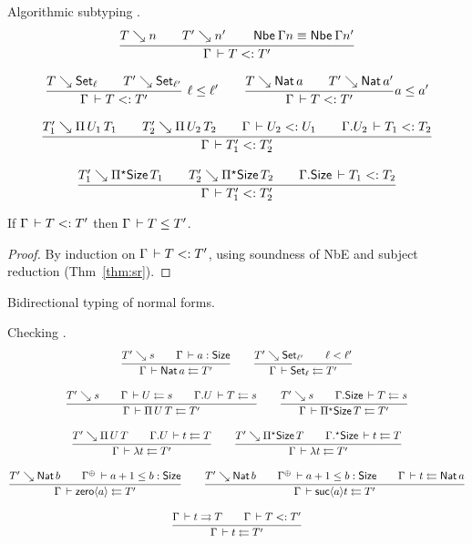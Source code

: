 \documentclass[acmlarge,review,anonymous]{acmart}\settopmatter{printfolios=true}
\begin{document}
Algorithmic subtyping .
\begin{gather*}
  \ru{T \evalsto n \qquad
      T' \evalsto n' \qquad
      \Nbe \Gamma n \equiv \Nbe \Gamma n'
    }{\Gamma \der T \asub T'}
\\[2ex]
  \rux{T \evalsto \Set[\ell] \qquad
      T' \evalsto \Set[\ell']
    }{\Gamma \der T \asub T'
    }{\ell \leq \ell'}
\qquad
  \ru{T \evalsto \Nat a \qquad
      T' \evalsto \Nat a'
    }{\Gamma \der T \asub T'
    }{a \leq a'}
\\[2ex]
  \ru{T_1' \evalsto \piT{U_1}{T_1} \qquad
      T_2' \evalsto \piT{U_2}{T_2} \qquad
      \Gamma \der U_2 \asub U_1 \qquad
      \cext \Gamma {U_2} \der T_1 \asub T_2
    }{\Gamma \der T_1' \asub T_2'}
\\[2ex]
  \ru{T_1' \evalsto \epiT\Size{T_1} \qquad
      T_2' \evalsto \epiT\Size{T_2} \qquad
      \cext \Gamma {\Size} \der T_1 \asub T_2
    }{\Gamma \der T_1' \asub T_2'}
\end{gather*}

\begin{lemma}
  \label{lem:asubsound}
  If $\Gamma \,\vdash T \mathrel{{<}{:}} T'$ then $\Gamma \,\vdash T \leq T'$.
\end{lemma}
\begin{proof}
  By induction on $\Gamma \,\vdash T \mathrel{{<}{:}} T'$, using soundness of NbE and subject reduction (Thm~\ref{thm:sr}).
\end{proof}

Bidirectional typing of normal forms.

Checking .
\begin{gather*}
  \ru{T' \evalsto s \qquad
      \Gamma \der a : \Size
    }{\Gamma \der \Nat a \jchk T'}
\qquad
  \ru{T' \evalsto \Set[\ell'] \qquad \ell < \ell'
    }{\Gamma \der \Set[\ell] \jchk T'}
\\[2ex]
  \ru{T' \evalsto s \qquad
      \Gamma \der U \jchk s \qquad
      \cext \Gamma U \der T \jchk s
    }{\Gamma \der \piT U T \jchk T'}
\qquad
  \ru{T' \evalsto s \qquad
      \cext \Gamma \Size \der T \jchk s
    }{\Gamma \der \epiT \Size T \jchk T'}
\\[2ex]
  \ru{T' \evalsto \piT U T \qquad
      \cext \Gamma U \der t \jchk T
    }{\Gamma \der \lambda t \jchk T'}
\qquad
  \ru{T' \evalsto \epiT \Size T \qquad
      \eext \Gamma \Size \der t \jchk T
    }{\Gamma \der \lambda t \jchk T'}
\\[2ex]
  \ru{T' \evalsto \Nat b \qquad
      \resurrect \Gamma \der a+1 \leq b : \Size
    }{\Gamma \der \zero a \jchk T'}
\qquad
  \ru{T' \evalsto \Nat b \qquad
      \resurrect \Gamma \der a+1 \leq b : \Size \qquad
      \Gamma \der t \jchk \Nat a
    }{\Gamma \der \suc a t \jchk T'}
\\[2ex]
  \ru{\Gamma \der t \jinf T \qquad \Gamma \der T \asub T'
    }{\Gamma \der t \jchk T'}
\end{gather*}
\end{document}
